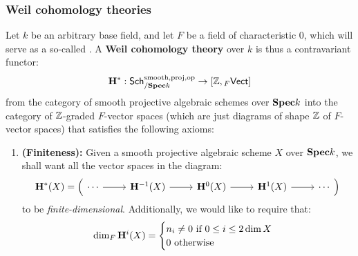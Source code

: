             \subsubsection{Weil cohomology theories}    
                \begin{definition} \label{def: weil_cohomology_theories}
                    Let $k$ be an arbitrary base field, and let $F$ be a field of characteristic $0$, which will serve as a so-called . A \textbf{Weil cohomology theory} over $k$ is thus a contravariant functor:
                        $$\mathbf{H}^*: \mathsf{Sch}_{/\mathbf{Spec} k}^{\mathrm{smooth}, \mathrm{proj}, \mathrm{op}} \to [\mathbb{Z}, {}_F\mathsf{Vect}]$$
                    from the category of smooth projective algebraic schemes over $\mathbf{Spec} k$ into the category of $\mathbb{Z}$-graded $F$-vector spaces (which are just diagrams of shape $\mathbb{Z}$ of $F$-vector spaces) that satisfies the following axioms:
                        \begin{enumerate}
                            \item \textbf{(Finiteness):} Given a smooth projective algebraic scheme $X$ over $\mathbf{Spec} k$, we shall want all the vector spaces in the diagram:
                                $$
                                    \H^*(X) =
                                    \left(
                                        \begin{tikzcd}
                                        	\cdots & {\H^{-1}(X)} & {\H^0(X)} & {\H^1(X)} & \cdots
                                        	\arrow[from=1-2, to=1-3]
                                        	\arrow[from=1-3, to=1-4]
                                        	\arrow[from=1-4, to=1-5]
                                        	\arrow[from=1-1, to=1-2]
                                        \end{tikzcd}
                                    \right)
                                $$
                            to be \textit{finite-dimensional}. Additionally, we would like to require that:
                                $$
                                    \dim_F \mathbf{H}^i(X) = 
                                    \begin{cases}
                                        \text{$n_i \not = 0$ if $0 \leq i \leq 2\dim X$}
                                        \\
                                        \text{$0$ otherwise}
                                    \end{cases}
                                $$

\end{enumerate}
\end{definition}
